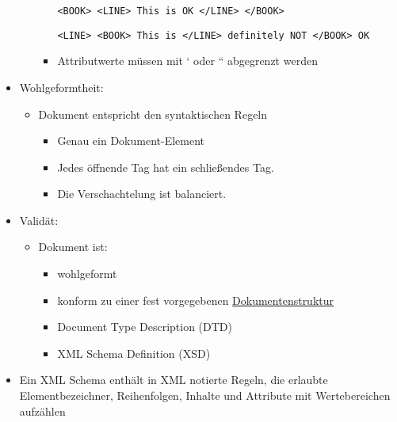\begin{itemize}
\begin{itemize}
\begin{itemize}
            \lstset{language=XML, breaklines=true}
            \begin{lstlisting}[label={lst:lstlisting5}]
                <BOOK> <LINE> This is OK </LINE> </BOOK>
            \end{lstlisting}
            \lstset{language=XML, breaklines=true}
            \begin{lstlisting}[label={lst:lstlisting6}]
                <LINE> <BOOK> This is </LINE> definitely NOT </BOOK> OK
            \end{lstlisting}
            \item Attributwerte müssen mit ‘ oder “ abgegrenzt werden
        \end{itemize}
    \end{itemize}
\end{itemize}

\begin{itemize}
    \item Wohlgeformtheit:
    \begin{itemize}
        \item Dokument entspricht den syntaktischen Regeln
        \begin{itemize}
            \item Genau ein Dokument-Element
            \item Jedes öffnende Tag hat ein schließendes Tag.
            \item Die Verschachtelung ist balanciert.
        \end{itemize}
    \end{itemize}
    \item Validät:
    \begin{itemize}
        \item Dokument ist:
        \begin{itemize}
            \item wohlgeformt
            \item konform zu einer fest vorgegebenen \underline{Dokumentenstruktur}
            \item Document Type Description (DTD)
            \item XML Schema Definition (XSD)
        \end{itemize}
    \end{itemize}
\end{itemize}

\begin{itemize}
    \item Ein XML Schema enthält in XML notierte Regeln, die erlaubte Elementbezeichner, Reihenfolgen, Inhalte und Attribute mit Wertebereichen aufzählen
\end{itemize}

